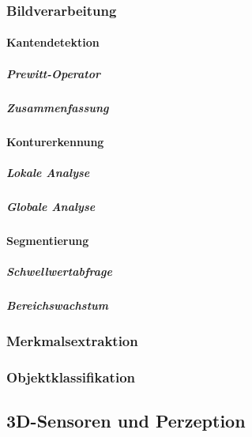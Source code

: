 \documentclass[a4paper, 11pt, accentcolor = tud3b]{tudreport}
\begin{document}
				\subsubsection{Bildverarbeitung} %

					\paragraph{Kantendetektion} %

						\subparagraph{Prewitt-Operator} %

						\subparagraph{Zusammenfassung} %

					\paragraph{Konturerkennung} %

						\subparagraph{Lokale Analyse} %

						\subparagraph{Globale Analyse} %

					\paragraph{Segmentierung} %

						\subparagraph{Schwellwertabfrage} %

						\subparagraph{Bereichswachstum} %

				\subsubsection{Merkmalsextraktion} %

				\subsubsection{Objektklassifikation} %

			\subsection{3D-Sensoren und Perzeption} %
\end{document}

